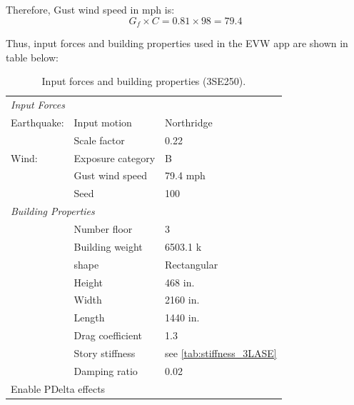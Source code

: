 \documentclass{simcenterdocumentation}
\begin{document}
Therefore, Gust wind speed in mph is:
\begin{equation*}
G_f \times C = 0.81 \times 98 = \boxed{79.4}
\end{equation*}

Thus, input forces and building properties used in the EVW app are shown in table below:

\begin{table}[H]
	\centering \caption{Input forces and building properties (3SE250).}
	\begin{tabular}{lll}
	\toprule
	\multicolumn{3}{l}{\textit{Input Forces}}					\\
	\cmidrule(rl){1-3}
	Earthquake:		& Input motion		& Northridge			\\
					& Scale factor		& 0.22					\\
	Wind:			& Exposure category	& B						\\
					& Gust wind speed	& 79.4 mph				\\
					& Seed				& 100					\\
	\midrule
	\multicolumn{3}{l}{\textit{Building Properties}}			\\
	\cmidrule(rl){1-3}
					& Number floor		& 3						\\
					& Building weight	& 6503.1 k				\\
					& shape				& Rectangular			\\
					& Height			& 468 in.				\\
					& Width				& 2160 in.				\\
					& Length			& 1440 in.				\\
					& Drag coefficient	& 1.3					\\
					& Story stiffness	& see \cref{tab:stiffness_3LASE}			\\
					& Damping ratio		& 0.02					\\
	\midrule
	\multicolumn{3}{l}{Enable PDelta effects}					\\
	\bottomrule
	\end{tabular}
\end{table}
\end{document}
